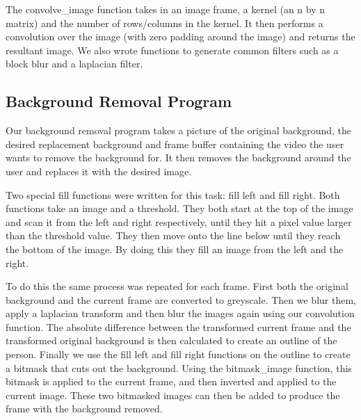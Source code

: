 \documentclass[11pt]{article}
\begin{document}
The convolve\_image function takes in an image frame, a kernel (an n by n matrix) and the number of rows/columns in the kernel. It then performs a convolution over the image (with zero padding around the image) and returns the resultant image. We also wrote functions to generate common filters such as a block blur and a laplacian filter.

  \subsection*{Background Removal Program}
Our background removal program takes a picture of the original background, the desired replacement background and frame buffer containing the video the user wants to remove the background for. It then removes the background around the user and replaces it with the desired image. 

Two special fill functions were written for this task: fill left and fill right. Both functions take an image and a threshold. They both start at the top of the image and scan it from the left and right respectively, until they hit a pixel value larger than the threshold value. They then move onto the line below until they reach the bottom of the image. By doing this they fill an image from the left and the right.

To do this the same process was repeated for each frame. First both the original background and the current frame are converted to greyscale. Then we blur them, apply a laplacian transform and then blur the images again using our convolution function. The absolute difference between the transformed current frame and the transformed original background is then calculated to create an outline of the person. Finally we use the fill left and fill right functions on the outline to create a bitmask that cuts out the background. Using the bitmask\_image function, this bitmask is applied to the current frame, and then inverted and applied to the current image. These two bitmasked images can then be added to produce the frame with the background removed. 
\end{document}
